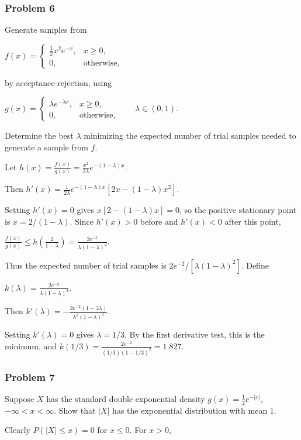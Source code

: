 \subsubsection*{Problem 6}

 Generate samples from

$f(x)=\begin{cases}\frac12x^2e^{-x},&x\geq0,\\0,&\text{otherwise},\end{cases}$

by acceptance-rejection, using

$g(x)=\begin{cases}\lambda e^{-\lambda x},&x\geq0,\\0,&\text{otherwise},\end{cases}\qquad \lambda\in(0,1)$.

Determine the best $\lambda$ minimizing the expected number of trial samples needed to generate a sample from $f$.

 Let
$h(x)=\frac{f(x)}{g(x)}=\frac{x^2}{2\lambda}e^{-(1-\lambda)x}$.

Then
$h'(x)=\frac1{2\lambda}e^{-(1-\lambda)x}[2x-(1-\lambda)x^2]$.

Setting $h'(x)=0$ gives $x[2-(1-\lambda)x]=0$, so the positive stationary point is $x=2/(1-\lambda)$. Since $h'(x)>0$ before and $h'(x)<0$ after this point,

$\frac{f(x)}{g(x)}\leq h\left(\frac2{1-\lambda}\right)=\frac{2e^{-2}}{\lambda(1-\lambda)^2}$.

Thus the expected number of trial samples is $2e^{-2}/[\lambda(1-\lambda)^2]$. Define

$k(\lambda)=\frac{2e^{-2}}{\lambda(1-\lambda)^2}$.

Then
$k'(\lambda)=-\frac{2e^{-2}(1-3\lambda)}{\lambda^2(1-\lambda)^3}$.

Setting $k'(\lambda)=0$ gives $\lambda=1/3$. By the first derivative test, this is the minimum, and
$k(1/3)=\frac{2e^{-2}}{(1/3)(1-1/3)^2}=1.827$.

\subsubsection*{Problem 7}

 Suppose $X$ has the standard double exponential density $g(x)=\frac12e^{-|x|}$, $-\infty<x<\infty$. Show that $|X|$ has the exponential distribution with mean $1$.

 Clearly $P(|X|\leq x)=0$ for $x\leq0$. For $x>0$,

